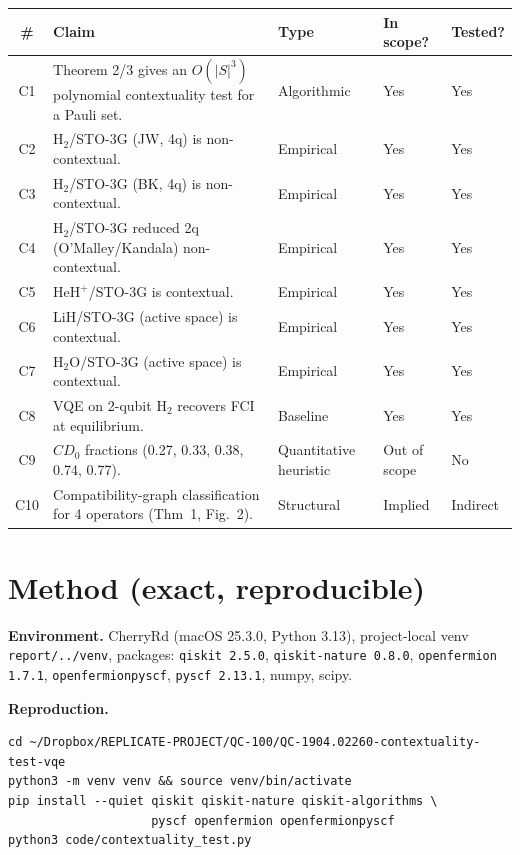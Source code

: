 \documentclass[11pt]{article}
\begin{document}
\begin{longtable}{@{}c p{7.5cm} l l l@{}}
\toprule
\# & Claim & Type & In scope? & Tested? \\
\midrule
C1 & Theorem 2/3 gives an $O(|S|^3)$ polynomial contextuality test for a Pauli set. & Algorithmic & Yes & Yes \\
C2 & $\mathrm{H}_2$/STO-3G (JW, 4q) is non-contextual. & Empirical & Yes & Yes \\
C3 & $\mathrm{H}_2$/STO-3G (BK, 4q) is non-contextual. & Empirical & Yes & Yes \\
C4 & $\mathrm{H}_2$/STO-3G reduced 2q (O'Malley/Kandala) non-contextual. & Empirical & Yes & Yes \\
C5 & $\mathrm{HeH}^+$/STO-3G is contextual. & Empirical & Yes & Yes \\
C6 & LiH/STO-3G (active space) is contextual. & Empirical & Yes & Yes \\
C7 & $\mathrm{H}_2\mathrm{O}$/STO-3G (active space) is contextual. & Empirical & Yes & Yes \\
C8 & VQE on 2-qubit $\mathrm{H}_2$ recovers FCI at equilibrium. & Baseline & Yes & Yes \\
C9 & $CD_0$ fractions (0.27, 0.33, 0.38, 0.74, 0.77). & Quantitative heuristic & Out of scope & No \\
C10 & Compatibility-graph classification for 4 operators (Thm~1, Fig.~2). & Structural & Implied & Indirect \\
\bottomrule
\end{longtable}

\section{Method (exact, reproducible)}

\textbf{Environment.} CherryRd (macOS 25.3.0, Python 3.13), project-local
venv \texttt{report/../venv}, packages: \texttt{qiskit 2.5.0},
\texttt{qiskit-nature 0.8.0}, \texttt{openfermion 1.7.1},
\texttt{openfermionpyscf}, \texttt{pyscf 2.13.1}, numpy, scipy.

\textbf{Reproduction.}
\begin{verbatim}
cd ~/Dropbox/REPLICATE-PROJECT/QC-100/QC-1904.02260-contextuality-test-vqe
python3 -m venv venv && source venv/bin/activate
pip install --quiet qiskit qiskit-nature qiskit-algorithms \
                    pyscf openfermion openfermionpyscf
python3 code/contextuality_test.py
\end{verbatim}
\end{document}
